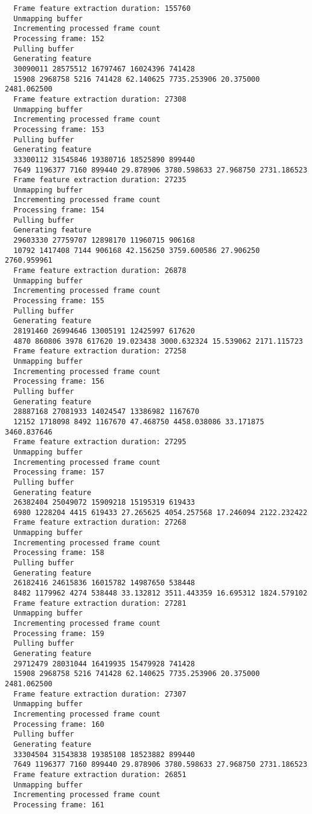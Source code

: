 \documentclass[12pt,oneside]{book}
\begin{document}
\begin{lstlisting}
  Frame feature extraction duration: 155760
  Unmapping buffer
  Incrementing processed frame count
  Processing frame: 152
  Pulling buffer
  Generating feature
  30090011 28575512 16797467 16024396 741428
  15908 2968758 5216 741428 62.140625 7735.253906 20.375000 2481.062500
  Frame feature extraction duration: 27308
  Unmapping buffer
  Incrementing processed frame count
  Processing frame: 153
  Pulling buffer
  Generating feature
  33300112 31545846 19380716 18525890 899440
  7649 1196377 7160 899440 29.878906 3780.598633 27.968750 2731.186523
  Frame feature extraction duration: 27235
  Unmapping buffer
  Incrementing processed frame count
  Processing frame: 154
  Pulling buffer
  Generating feature
  29603330 27759707 12898170 11960715 906168
  10792 1417408 7144 906168 42.156250 3759.600586 27.906250 2760.959961
  Frame feature extraction duration: 26878
  Unmapping buffer
  Incrementing processed frame count
  Processing frame: 155
  Pulling buffer
  Generating feature
  28191460 26994646 13005191 12425997 617620
  4870 860806 3978 617620 19.023438 3000.632324 15.539062 2171.115723
  Frame feature extraction duration: 27258
  Unmapping buffer
  Incrementing processed frame count
  Processing frame: 156
  Pulling buffer
  Generating feature
  28887168 27081933 14024547 13386982 1167670
  12152 1718098 8492 1167670 47.468750 4458.038086 33.171875 3460.837646
  Frame feature extraction duration: 27295
  Unmapping buffer
  Incrementing processed frame count
  Processing frame: 157
  Pulling buffer
  Generating feature
  26382404 25049072 15909218 15195319 619433
  6980 1228204 4415 619433 27.265625 4054.257568 17.246094 2122.232422
  Frame feature extraction duration: 27268
  Unmapping buffer
  Incrementing processed frame count
  Processing frame: 158
  Pulling buffer
  Generating feature
  26182416 24615836 16015782 14987650 538448
  8482 1179962 4274 538448 33.132812 3511.443359 16.695312 1824.579102
  Frame feature extraction duration: 27281
  Unmapping buffer
  Incrementing processed frame count
  Processing frame: 159
  Pulling buffer
  Generating feature
  29712479 28031044 16419935 15479928 741428
  15908 2968758 5216 741428 62.140625 7735.253906 20.375000 2481.062500
  Frame feature extraction duration: 27307
  Unmapping buffer
  Incrementing processed frame count
  Processing frame: 160
  Pulling buffer
  Generating feature
  33304504 31543838 19385108 18523882 899440
  7649 1196377 7160 899440 29.878906 3780.598633 27.968750 2731.186523
  Frame feature extraction duration: 26851
  Unmapping buffer
  Incrementing processed frame count
  Processing frame: 161

\end{lstlisting}
\end{document}
